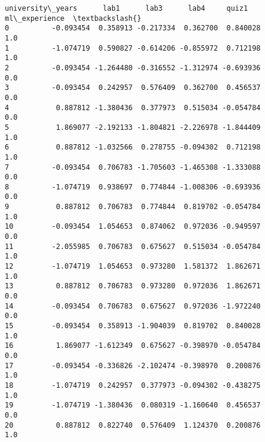 \documentclass[11pt]{article}
\makeatletter
\newcommand{\boxspacing}{\kern\kvtcb@left@rule\kern\kvtcb@boxsep}
\newcommand{\prompt}[4]{
        {\ttfamily\llap{{\color{#2}[#3]:\hspace{3pt}#4}}\vspace{-\baselineskip}}
    }
\makeatother
\begin{document}
            \begin{tcolorbox}[breakable, size=fbox, boxrule=.5pt, pad at break*=1mm, opacityfill=0]
\prompt{Out}{outcolor}{17}{\boxspacing}
\begin{Verbatim}[commandchars=\\\{\}]
    university\_years      lab1      lab3      lab4     quiz1  ml\_experience  \textbackslash{}
0          -0.093454  0.358913 -0.217334  0.362700  0.840028            1.0
1          -1.074719  0.590827 -0.614206 -0.855972  0.712198            1.0
2          -0.093454 -1.264480 -0.316552 -1.312974 -0.693936            0.0
3          -0.093454  0.242957  0.576409  0.362700  0.456537            0.0
4           0.887812 -1.380436  0.377973  0.515034 -0.054784            0.0
5           1.869077 -2.192133 -1.804821 -2.226978 -1.844409            1.0
6           0.887812 -1.032566  0.278755 -0.094302  0.712198            1.0
7          -0.093454  0.706783 -1.705603 -1.465308 -1.333088            0.0
8          -1.074719  0.938697  0.774844 -1.008306 -0.693936            0.0
9           0.887812  0.706783  0.774844  0.819702 -0.054784            1.0
10         -0.093454  1.054653  0.874062  0.972036 -0.949597            0.0
11         -2.055985  0.706783  0.675627  0.515034 -0.054784            1.0
12         -1.074719  1.054653  0.973280  1.581372  1.862671            1.0
13          0.887812  0.706783  0.973280  0.972036  1.862671            0.0
14         -0.093454  0.706783  0.675627  0.972036 -1.972240            0.0
15         -0.093454  0.358913 -1.904039  0.819702  0.840028            1.0
16          1.869077 -1.612349  0.675627 -0.398970 -0.054784            0.0
17         -0.093454 -0.336826 -2.102474 -0.398970  0.200876            1.0
18         -1.074719  0.242957  0.377973 -0.094302 -0.438275            1.0
19         -1.074719 -1.380436  0.080319 -1.160640  0.456537            0.0
20          0.887812  0.822740  0.576409  1.124370  0.200876            1.0


\end{Verbatim}
\end{tcolorbox}
\end{document}
